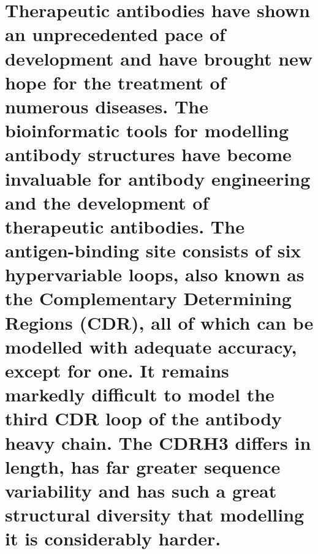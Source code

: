 \documentclass[
]{article}
\begin{document}
{\section{\texorpdfstring{Therapeutic antibodies have shown an
unprecedented pace of development and have brought new hope for the
treatment of numerous diseases. The bioinformatic tools for modelling
antibody structures have become invaluable for antibody engineering and
the development of therapeutic antibodies. The antigen-binding site
consists of six hypervariable loops, also known as the Complementary
Determining Regions (CDR), all of which can be modelled with adequate
accuracy, except for one. It remains markedly difficult to model the
third CDR loop of the antibody heavy chain. The CDRH3 differs in length,
has far greater sequence variability and has such a great structural
diversity that modelling it is considerably harder.
}{Therapeutic antibodies have shown an unprecedented pace of development and have brought new hope for the treatment of numerous diseases. The bioinformatic tools for modelling antibody structures have become invaluable for antibody engineering and the development of therapeutic antibodies. The antigen-binding site consists of six hypervariable loops, also known as the Complementary Determining Regions (CDR), all of which can be modelled with adequate accuracy, except for one. It remains markedly difficult to model the third CDR loop of the antibody heavy chain. The CDRH3 differs in length, has far greater sequence variability and has such a great structural diversity that modelling it is considerably harder. }}\label{therapeutic-antibodies-have-shown-an-unprecedented-pace-of-development-and-have-brought-new-hope-for-the-treatment-of-numerous-diseases.-the-bioinformatic-tools-for-modelling-antibody-structures-have-become-invaluable-for-antibody-engineering-and-the-development-of-therapeutic-antibodies.-the-antigen-binding-site-consists-of-six-hypervariable-loops-also-known-as-the-complementary-determining-regions-cdr-all-of-which-can-be-modelled-with-adequate-accuracy-except-for-one.-it-remains-markedly-difficult-to-model-the-third-cdr-loop-of-the-antibody-heavy-chain.-the-cdrh3-differs-in-length-has-far-greater-sequence-variability-and-has-such-a-great-structural-diversity-that-modelling-it-is-considerably-harder.}}
\end{document}
